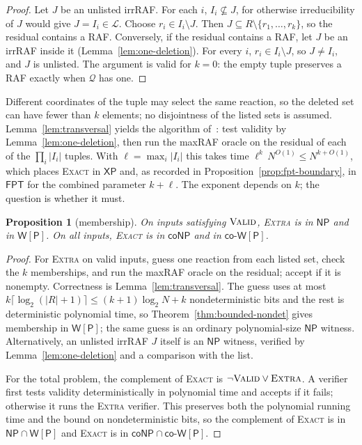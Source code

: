 \documentclass[11pt,a4paper]{article}
\theoremstyle{plain}
\newtheorem{proposition}[theorem]{Proposition}
\theoremstyle{definition}
\theoremstyle{remark}
\newcommand{\Valid}{\textup{\textsc{Valid}}}
\newcommand{\Exact}{\textup{\textsc{Exact}}}
\newcommand{\Extra}{\textup{\textsc{Extra}}}
\newcommand{\NP}{\mathsf{NP}}
\newcommand{\coNP}{\mathsf{coNP}}
\newcommand{\FPT}{\mathsf{FPT}}
\newcommand{\XP}{\mathsf{XP}}
\newcommand{\WP}{\mathsf{W[P]}}
\newcommand{\coWP}{\mathsf{co\text{-}W[P]}}
\newcommand{\cL}{\mathcal{L}}
\newcommand{\cQ}{\mathcal{Q}}
\newcommand{\Nlen}{N}
\begin{document}
\begin{proof}
Let $J$ be an unlisted irrRAF. For each $i$, $I_i\not\subseteq J$, for otherwise irreducibility of $J$ would give $J=I_i\in\cL$. Choose $r_i\in I_i\setminus J$. Then $J\subseteq R\setminus\{r_1,\dots,r_k\}$, so the residual contains a RAF. Conversely, if the residual contains a RAF, let $J$ be an irrRAF inside it (Lemma~\ref{lem:one-deletion}). For every $i$, $r_i\in I_i\setminus J$, so $J\ne I_i$, and $J$ is unlisted. The argument is valid for $k=0$: the empty tuple preserves a RAF exactly when $\cQ$ has one.
\end{proof}

Different coordinates of the tuple may select the same reaction, so the deleted set can have fewer than $k$ elements; no disjointness of the listed sets is assumed. Lemma~\ref{lem:transversal} yields the algorithm of~\cite{steel2013minimal}: test validity by Lemma~\ref{lem:one-deletion}, then run the maxRAF oracle on the residual of each of the $\prod_i|I_i|$ tuples. With $\ell=\max_i|I_i|$ this takes time $\ell^{k}\,\Nlen^{O(1)}\le\Nlen^{k+O(1)}$, which places \Exact{} in $\XP$ and, as recorded in Proposition~\ref{prop:fpt-boundary}, in $\FPT$ for the combined parameter $k+\ell$. The exponent depends on $k$; the question is whether it must.

\begin{proposition}[membership]\label{prop:membership}
On inputs satisfying $\Valid$, \Extra{} is in $\NP$ and in $\WP$. On all inputs, \Exact{} is in $\coNP$ and in $\coWP$.
\end{proposition}

\begin{proof}
For \Extra{} on valid inputs, guess one reaction from each listed set, check the $k$ memberships, and run the maxRAF oracle on the residual; accept if it is nonempty. Correctness is Lemma~\ref{lem:transversal}. The guess uses at most $k\lceil\log_2(|R|+1)\rceil\le (k+1)\log_2\Nlen+k$ nondeterministic bits and the rest is deterministic polynomial time, so Theorem~\ref{thm:bounded-nondet} gives membership in $\WP$; the same guess is an ordinary polynomial-size $\NP$ witness. Alternatively, an unlisted irrRAF $J$ itself is an $\NP$ witness, verified by Lemma~\ref{lem:one-deletion} and a comparison with the list.

For the total problem, the complement of \Exact{} is $\neg\Valid\vee\Extra$. A verifier first tests validity deterministically in polynomial time and accepts if it fails; otherwise it runs the \Extra{} verifier. This preserves both the polynomial running time and the bound on nondeterministic bits, so the complement of \Exact{} is in $\NP\cap\WP$ and \Exact{} is in $\coNP\cap\coWP$.
\end{proof}
\end{document}
